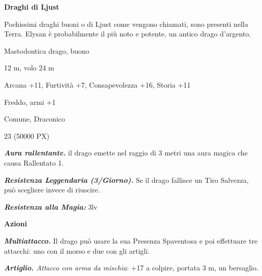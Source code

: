 \begin{multicols}{2}
{\medskip

\textbf{Draghi di Ljust}


Pochissimi draghi buoni o di Ljust come vengono chiamati, sono presenti nella Terra.
Elysan è probabilmente il più noto e potente, un antico drago d'argento.

\begin{description}[noitemsep, topsep=0pt, parsep=0pt, partopsep=0pt, itemsep=1pt, leftmargin=2.35cm,  labelwidth=2.2cm, itemindent=0cm, listparindent=0pt] %
\setlength{\baselineskip}{10pt}
\item[\textbf{Taglia/Tipo}] Mastodontica drago, buono
\item[\textbf{Caratt.}] 
\item[\textbf{Punti Ferita}] 
\item[\textbf{Movimento}] 12 m, volo 24 m
\item[\textbf{Tiri Salvez.}] 
\item[\textbf{Comp.}] Arcana +11, Furtività +7, Consapevolezza +16, Storia +11
\item[\textbf{Imm. Danni}] Freddo, armi +1
\item[\textbf{Sensi}] 
\item[\textbf{Linguaggi}] Comune, Draconico
\item[\textbf{Sfida}] 23 (50000 PX)
\end{description}
\smallskip

\emph{\textbf{Aura rallentante.}} il drago emette nel raggio di 3 metri una aura magica che causa Rallentato 1.

\emph{\textbf{Resistenza Leggendaria (3/Giorno).}} Se il drago fallisce un Tiro Salvezza, può scegliere invece di riuscire.

\emph{\textbf{Resistenza alla Magia:}} 3lv

\textbf{Azioni}

\emph{\textbf{Multiattacco.}} Il drago può usare la sua Presenza Spaventosa e poi effettuare tre attacchi: uno con il morso e due con gli artigli.

\emph{\textbf{Artiglio.} Attacco con arma da mischia}: +17 a colpire, portata 3 m, un bersaglio.

}
\end{multicols}
